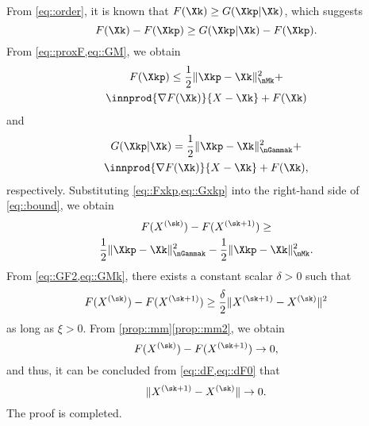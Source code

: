 From \cref{eq::order}, it is known that $F(\Xk)\geq G(\Xkp|\Xk)$, which suggests
\begin{equation}\label{eq::bound}
F(\Xk)- F(\Xkp) \geq
G(\Xkp|\Xk) - F(\Xkp).
\end{equation}
From \cref{eq::proxF,eq::GM}, we obtain
\begin{multline}\label{eq::Fxkp}
F(\Xkp) \leq \frac{1}{2}\|\Xkp-\Xk\|_{\nMk}^2+\\
\innprod{\nabla F(\Xk)}{X-\Xk}+F(\Xk)
\end{multline}
and
\begin{multline}\label{eq::Gxkp}
G(\Xkp|\Xk)=\frac{1}{2}\|\Xkp-\Xk\|_{\nGammak}^2+\\
\innprod{\nabla F(\Xk)}{X-\Xk}+F(\Xk),
\end{multline}
respectively. Substituting \cref{eq::Fxkp,eq::Gxkp} into the right-hand side of \cref{eq::bound}, we obtain
\begin{multline}\label{eq::GF2}
F(X^{(\sk)}) - F(X^{(\sk+1)}) \geq\\
\frac{1}{2}\|\Xkp-\Xk\|_{\nGammak}^2-\frac{1}{2}\|\Xkp-\Xk\|_{\nMk}^2.
\end{multline}
From \cref{eq::GF2,eq::GMk}, there exists a constant scalar $\delta>0$ such that
\begin{equation}\label{eq::dF}
F(X^{(\sk)}) - F(X^{(\sk+1)}) \geq
\frac{\delta}{2}\|X^{(\sk+1)}-X^{(\sk)}\|^2
\end{equation}
as long as $\xi>0$. From \cref{prop::mm}\ref{prop::mm2}, we obtain
\begin{equation}\label{eq::dF0}
F(X^{(\sk)}) - F(X^{(\sk+1)})\rightarrow 0,
\end{equation}
and thus, it can be concluded from \cref{eq::dF,eq::dF0} that
\begin{equation}
\|X^{(\sk+1)}-X^{(\sk)}\| \rightarrow 0.
\end{equation}
The proof is completed.

